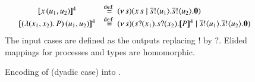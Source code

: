 \begin{figure}[t]
\[\begin{array}{lcl}
	& \map{\appl{x}{(u_1, u_2)}}^{4} &\defeq \newsp{s}{\appl{x}{s} \Par \bout{\dual{s}}{u_1}   \bout{\dual{s}}{u_2} \inact}
	\\
	& \map{\appl{(\abs{(x_1,x_2)}{P})}{(u_1, u_2)}}^{4} &\defeq
	\newsp{s}{\binp{s}{x_1}  \binp{s}{x_2} \pmap{P}{4} \Par \bout{\dual{s}}{u_1}  \bout{\dual{s}}{u_2} \inact} 
\end{array}
\]
The input cases are defined as the outputs replacing $!$ by $?$. 
Elided mappings for  processes and types are 
homomorphic.
\vspace{-2mm}
\caption{\label{f:enc:poltomon}Encoding of \PHOp (dyadic case) into \HOp. }
\vspace{-1mm} 
\end{figure}

